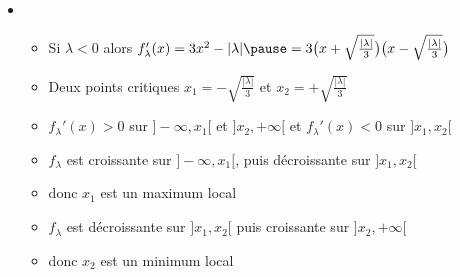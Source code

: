 \begin{frame}
\begin{exemple}[Extremums de $f_\lambda(x)= x^3+\lambda x$, $\lambda \in \Rr$]

\pause

\begin{itemize}
  \item
  \begin{itemize}
     \item Si $\lambda <0$ \pause alors $f'_\lambda(x)= 3x^2-|\lambda| \pause
= 3\big(x+\sqrt{\frac{|\lambda|}{3}}\big)\big(x-\sqrt{\frac{|\lambda|}{3}}\big)$
\pause
     \item Deux points critiques $x_1= -\sqrt{\frac{|\lambda|}{3}}$ et $x_2=+\sqrt{\frac{|\lambda|}{3}}$
\pause
     \item $f_\lambda'(x) > 0$ sur $]-\infty,x_1[$ et $]x_2,+\infty[$ et $f_\lambda'(x) < 0$ sur $]x_1,x_2[$
\pause
     \item $f_\lambda$ est croissante sur $]-\infty,x_1[$, puis décroissante sur $]x_1,x_2[$
\pause
     \item donc $x_1$ est un maximum local
\pause
     \item $f_\lambda$ est décroissante sur $]x_1,x_2[$ 
puis croissante sur $]x_2,+\infty[$ 
\pause
     \item donc $x_2$ est un minimum local
  \end{itemize}
\end{itemize}
\pause
\vspace*{-6ex}
\vspace*{-2ex}
\end{exemple}
\end{frame}

